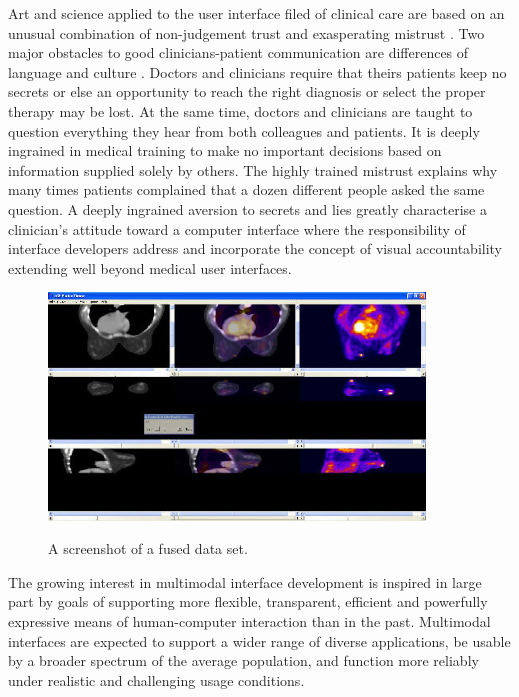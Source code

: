Art and science \cite{Czerwinski04adiary} applied to the user interface filed of clinical care are based on an unusual combination of non-judgement trust and exasperating mistrust \cite{Robertson04scalablefabric:}. Two major obstacles to good clinicians-patient communication are differences of language and culture \cite{Robertson00thetask}. Doctors and clinicians require that theirs patients keep no secrets or else an opportunity to reach the right diagnosis or select the proper therapy may be lost. At the same time, doctors and clinicians are taught to question everything they hear from both colleagues and patients. It is deeply ingrained in medical training to make no important decisions based on information supplied solely by others. The highly trained mistrust explains why many times patients complained that a dozen different people asked the same question. A deeply ingrained aversion to secrets and lies greatly characterise a clinician’s attitude toward a computer interface where the responsibility of interface developers address and incorporate the concept of visual accountability extending well beyond medical user interfaces.

\clearpage

\begin{figure}[!hbt]
\centering
\includegraphics[width=10cm]{images/multimodalbreastimage}~\\
\caption{\label{fig:screenshot}A screenshot of a fused data set.
}
\end{figure}

The growing interest in multimodal interface development is inspired in large part by goals of supporting more flexible, transparent, efficient and powerfully expressive means of human-computer interaction than in the past. Multimodal interfaces are expected to support a wider range of diverse applications, be usable by a broader spectrum of the average population, and function more reliably under realistic and challenging usage conditions.

